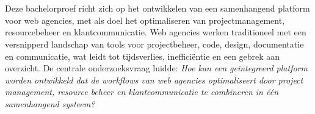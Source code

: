
%
%
%
%
%

%



\chapter*{}

Deze bachelorproef richt zich op het ontwikkelen van een samenhangend platform voor web agencies, met als doel het optimaliseren van projectmanagement, resourcebeheer en klantcommunicatie. Web agencies werken traditioneel met een versnipperd landschap van tools voor projectbeheer, code, design, documentatie en communicatie, wat leidt tot tijdsverlies, inefficiëntie en een gebrek aan overzicht. De centrale onderzoeksvraag luidde: \emph{Hoe kan een geïntegreerd platform worden ontwikkeld dat de workflows van web agencies optimaliseert door project management, resource beheer en klantcommunicatie te combineren in één samenhangend systeem?}


